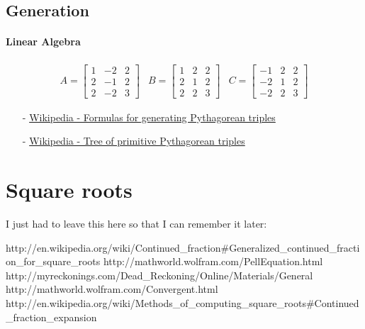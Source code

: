 \documentclass[a4paper]{report}
\begin{document}
\subsection{Generation}

\paragraph{Linear Algebra}

\begin{equation}
    \begin{array}{lcr}
    A = \begin{bmatrix} 1 & -2 & 2 \\ 2 & -1 & 2 \\ 2 & -2 & 3 \end{bmatrix} &
    B = \begin{bmatrix} 1 & 2 & 2 \\ 2 & 1 & 2 \\ 2 & 2 & 3 \end{bmatrix} &
    C = \begin{bmatrix} -1 & 2 & 2 \\ -2 & 1 & 2 \\ -2 & 2 & 3 \end{bmatrix}
    \end{array}
\end{equation}

\begin{itemize}
    \item[-]\href{http://en.wikipedia.org/wiki/Formulas_for_generating_Pythagorean_triples}{Wikipedia - Formulas for generating Pythagorean triples}
    \item[-]\href{http://en.wikipedia.org/wiki/Tree_of_primitive_Pythagorean_triples}{Wikipedia - Tree of primitive Pythagorean triples}
\end{itemize}

\section{Square roots}

I just had to leave this here so that I can remember it later:

http://en.wikipedia.org/wiki/Continued_fraction#Generalized_continued_fraction_for_square_roots
http://mathworld.wolfram.com/PellEquation.html
http://myreckonings.com/Dead_Reckoning/Online/Materials/General%
http://mathworld.wolfram.com/Convergent.html
http://en.wikipedia.org/wiki/Methods_of_computing_square_roots#Continued_fraction_expansion
\end{document}
